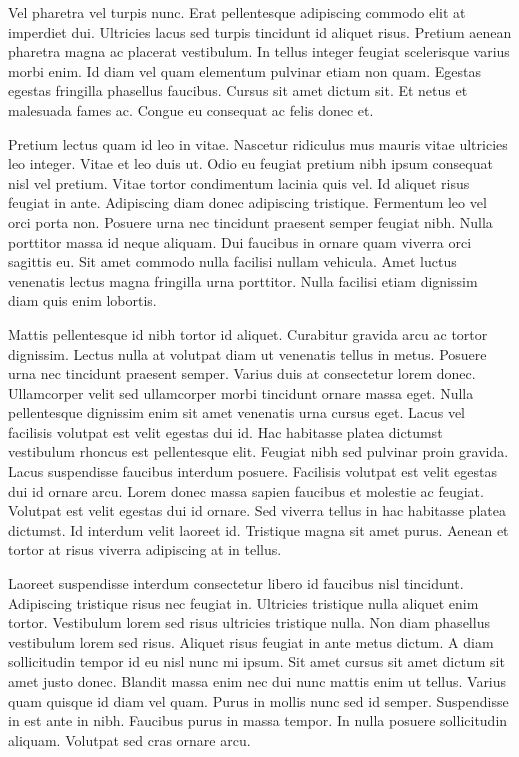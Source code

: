 \documentclass[11pt]{article}
\begin{document}
Vel pharetra vel turpis nunc. Erat pellentesque adipiscing commodo elit at imperdiet dui. Ultricies lacus sed turpis tincidunt id aliquet risus. Pretium aenean pharetra magna ac placerat vestibulum. In tellus integer feugiat scelerisque varius morbi enim. Id diam vel quam elementum pulvinar etiam non quam. Egestas egestas fringilla phasellus faucibus. Cursus sit amet dictum sit. Et netus et malesuada fames ac. Congue eu consequat ac felis donec et.

Pretium lectus quam id leo in vitae. Nascetur ridiculus mus mauris vitae ultricies leo integer. Vitae et leo duis ut. Odio eu feugiat pretium nibh ipsum consequat nisl vel pretium. Vitae tortor condimentum lacinia quis vel. Id aliquet risus feugiat in ante. Adipiscing diam donec adipiscing tristique. Fermentum leo vel orci porta non. Posuere urna nec tincidunt praesent semper feugiat nibh. Nulla porttitor massa id neque aliquam. Dui faucibus in ornare quam viverra orci sagittis eu. Sit amet commodo nulla facilisi nullam vehicula. Amet luctus venenatis lectus magna fringilla urna porttitor. Nulla facilisi etiam dignissim diam quis enim lobortis.

Mattis pellentesque id nibh tortor id aliquet. Curabitur gravida arcu ac tortor dignissim. Lectus nulla at volutpat diam ut venenatis tellus in metus. Posuere urna nec tincidunt praesent semper. Varius duis at consectetur lorem donec. Ullamcorper velit sed ullamcorper morbi tincidunt ornare massa eget. Nulla pellentesque dignissim enim sit amet venenatis urna cursus eget. Lacus vel facilisis volutpat est velit egestas dui id. Hac habitasse platea dictumst vestibulum rhoncus est pellentesque elit. Feugiat nibh sed pulvinar proin gravida. Lacus suspendisse faucibus interdum posuere. Facilisis volutpat est velit egestas dui id ornare arcu. Lorem donec massa sapien faucibus et molestie ac feugiat. Volutpat est velit egestas dui id ornare. Sed viverra tellus in hac habitasse platea dictumst. Id interdum velit laoreet id. Tristique magna sit amet purus. Aenean et tortor at risus viverra adipiscing at in tellus.

Laoreet suspendisse interdum consectetur libero id faucibus nisl tincidunt. Adipiscing tristique risus nec feugiat in. Ultricies tristique nulla aliquet enim tortor. Vestibulum lorem sed risus ultricies tristique nulla. Non diam phasellus vestibulum lorem sed risus. Aliquet risus feugiat in ante metus dictum. A diam sollicitudin tempor id eu nisl nunc mi ipsum. Sit amet cursus sit amet dictum sit amet justo donec. Blandit massa enim nec dui nunc mattis enim ut tellus. Varius quam quisque id diam vel quam. Purus in mollis nunc sed id semper. Suspendisse in est ante in nibh. Faucibus purus in massa tempor. In nulla posuere sollicitudin aliquam. Volutpat sed cras ornare arcu.
\end{document}
